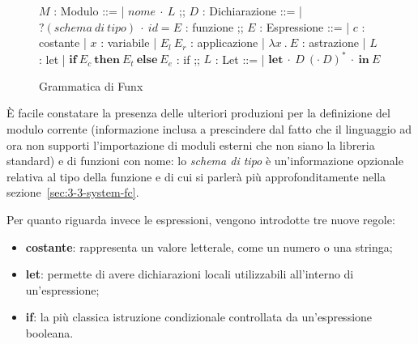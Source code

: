 \newpage

\begin{figure}
    \begin{bnf}
        $M$ : \small{Modulo} ::=
        | $nome\ \cdot\ L$
        ;;
        $D$ : \small{Dichiarazione} ::=
        | $?(schema\ di\ tipo)\ \cdot\ id = E$ : \small{funzione}
        ;;
        $E$ : \small{Espressione} ::=
        | $c$ : \small{costante}
        | $x$ : \small{variabile}
        | $E_l\ E_r$ : \small{applicazione}
        | $\lambda x\ .\ E$ : \small{astrazione}
        | $L$ : \small{let}
        | $\textbf{if}\ E_c\ \textbf{then}\ E_t\ \textbf{else}\ E_e$ : \small{if}
        ;;
        $L$ : \small{Let} ::=
        | $\textbf{let}\ \cdot\ D\ (\cdot\ D)^*\ \cdot\ \textbf{in}\ E$
    \end{bnf}
    \caption{Grammatica di Funx}
    \label{fig:2-funx-syntax}
    \vspace{4mm}
\end{figure}

\noindent È facile constatare la presenza delle ulteriori produzioni per la definizione del modulo corrente
(informazione inclusa a prescindere dal fatto che il linguaggio ad ora non supporti l'importazione di moduli esterni
che non siano la libreria standard) e di funzioni con nome: lo \textit{schema di tipo} è un'informazione opzionale
relativa al tipo della funzione e di cui si parlerà più approfonditamente nella sezione~\ref{sec:3-3-system-fc}.

\noindent Per quanto riguarda invece le espressioni, vengono introdotte tre nuove regole:
\begin{itemize}
    \item \textbf{costante}: rappresenta un valore letterale, come un numero o una stringa;
    \item \textbf{let}: permette di avere dichiarazioni locali utilizzabili all'interno di un'espressione;
    \item \textbf{if}: la più classica istruzione condizionale controllata da un'espressione booleana.
\end{itemize}